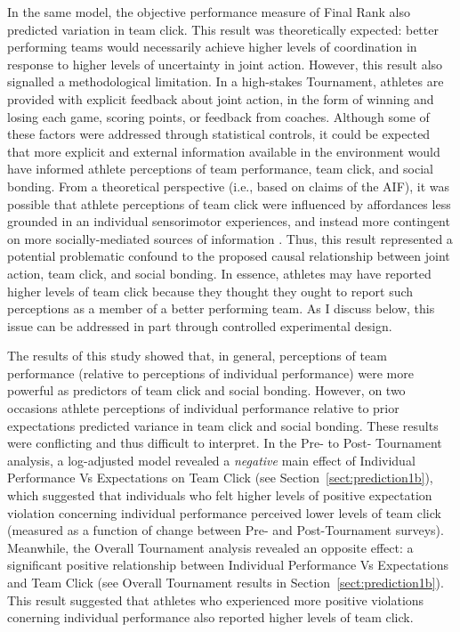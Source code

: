 \begin{CJK}{UTF8}{gbsn}
In the same model, the objective performance measure of Final Rank also predicted variation in team click.  This result was theoretically expected: better performing teams would necessarily achieve higher levels of coordination in response to higher levels of uncertainty in joint action.  However, this result also signalled a methodological limitation.  In a high-stakes Tournament, athletes are provided with explicit feedback about joint action, in the form of winning and losing each game, scoring points, or feedback from coaches.   Although some of these factors were addressed through statistical controls, it could be expected that more explicit and external information available in the environment would have informed athlete perceptions of team performance, team click, and social bonding. From a theoretical perspective (i.e., based on claims of the AIF), it was possible that athlete perceptions of team click were influenced by affordances less grounded in an individual sensorimotor experiences, and instead more contingent on more socially-mediated sources of information \citep{Ramstead2016}.  Thus, this result represented a potential problematic confound to the proposed causal relationship between joint action, team click, and social bonding.  In essence, athletes may have reported higher levels of team click because they thought they ought to report such perceptions as a member of a better performing team. As I discuss below, this issue can be addressed in part through controlled experimental design.

The results of this study showed that, in general, perceptions of team performance (relative to perceptions of individual performance) were more powerful as predictors of team click and social bonding.  However, on two occasions athlete perceptions of individual performance relative to prior expectations predicted variance in team click and social bonding. These results were conflicting and thus difficult to interpret.  In the Pre- to Post- Tournament analysis, a log-adjusted model revealed a \textit{negative} main effect of Individual Performance Vs Expectations on Team Click (see Section~\ref{sect:prediction1b}), which suggested that individuals who felt higher levels of positive expectation violation concerning individual performance perceived lower levels of team click (measured as a function of change between Pre- and Post-Tournament surveys).  Meanwhile, the Overall Tournament analysis revealed an opposite effect: a significant positive relationship between Individual Performance Vs Expectations and Team Click (see Overall Tournament results in Section~\ref{sect:prediction1b}). This result suggested that athletes who experienced more positive violations conerning individual performance also reported higher levels of team click.


\end{CJK}
